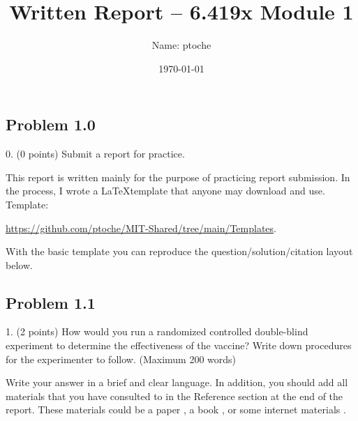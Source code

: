 \documentclass[11pt]{article}
\author{Name: ptoche}%
\title{Written Report – 6.419x Module 1}%
\date{\today}%
\begin{document}
\section*{\centering\thetitle}
\subsection*{\raggedleft\theauthor}

\subsection*{Problem 1.0}
\begin{question}
0. (0 points) 
Submit a report for practice. 
\end{question}

\begin{solution}
This report is written mainly for the purpose of practicing report submission. In the process, I wrote a \LaTeX template that anyone may download and use. 
Template:

\url{https://github.com/ptoche/MIT-Shared/tree/main/Templates}.

With the basic template you can reproduce the question/solution/citation layout below. 
\end{solution}

\sepline

\subsection*{Problem 1.1}
\begin{question}
1. (2 points) 
How would you run a randomized controlled double-blind experiment to determine the effectiveness of the vaccine? Write down procedures for the experimenter to follow. 
(Maximum 200 words)
\end{question}

\begin{solution}
Write your answer in a brief and clear language. In addition, you should add all materials that you have consulted to in the Reference section at the end of the report.  These materials could be a paper \cite{Wasserstein:2016}, a book \cite{Gustavii:2017}, or some internet materials \cite{Wiki:PCA}.
\end{solution}


\sepline


\printbibliography%
\end{document}
